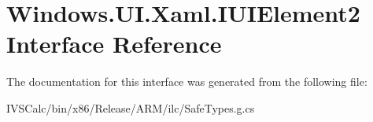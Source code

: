 \hypertarget{interface_windows_1_1_u_i_1_1_xaml_1_1_i_u_i_element2}{}\section{Windows.\+U\+I.\+Xaml.\+I\+U\+I\+Element2 Interface Reference}
\label{interface_windows_1_1_u_i_1_1_xaml_1_1_i_u_i_element2}


The documentation for this interface was generated from the following file\+:\begin{DoxyCompactItemize}
\item 
I\+V\+S\+Calc/bin/x86/\+Release/\+A\+R\+M/ilc/Safe\+Types.\+g.\+cs\end{DoxyCompactItemize}
